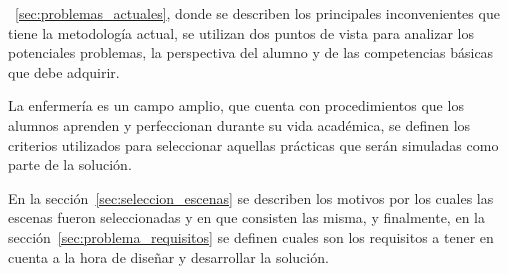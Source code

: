 
~\ref{sec:problemas_actuales}, donde se describen los
principales inconvenientes que tiene la metodología actual, se utilizan dos
puntos de vista para analizar los potenciales problemas, la perspectiva del
alumno y de las competencias básicas que debe adquirir.

La enfermería es un campo amplio, que cuenta con  procedimientos que los alumnos aprenden y perfeccionan durante su
vida académica, se definen los criterios
utilizados para seleccionar aquellas prácticas que serán simuladas como parte de
la solución.

En la sección~\ref{sec:seleccion_escenas} se describen los motivos por los
cuales las escenas fueron seleccionadas y en que consisten las misma, y
finalmente, en la sección~\ref{sec:problema_requisitos} se definen cuales son
los requisitos a tener en cuenta a la hora de diseñar y desarrollar la
solución.









